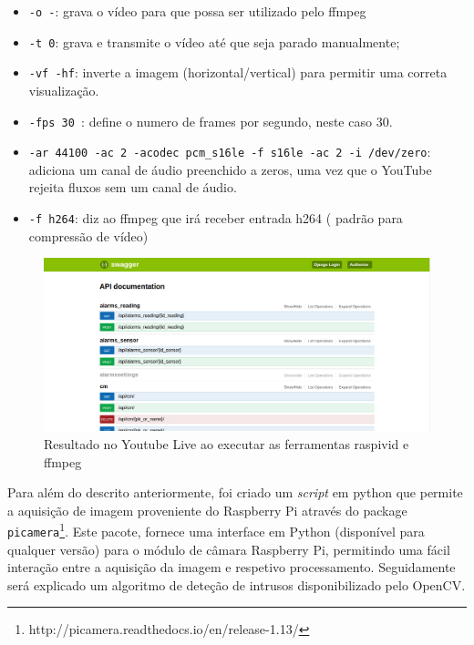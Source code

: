\begin{itemize}
	\item \texttt{-o -}: grava o vídeo para que possa ser utilizado pelo ffmpeg 
	
	\item \texttt{-t 0}: grava e transmite o vídeo até que seja parado manualmente; 
	
	\item \texttt{-vf -hf}: inverte a imagem (horizontal/vertical) para permitir uma correta visualização. 
	
	\item \texttt{-fps 30 }: define o numero de frames por segundo, neste caso 30. 
	
	\item \texttt{-ar 44100 -ac 2 -acodec pcm\_s16le -f s16le -ac 2 -i /dev/zero}: adiciona um canal de áudio preenchido a zeros, uma vez que o YouTube rejeita fluxos sem um canal de áudio.
	
	\item \texttt{-f h264}: diz ao ffmpeg que irá receber entrada h264 ( padrão para compressão de vídeo) 
	
\end{itemize}


\begin{figure}[h]
	\centering
	\includegraphics[width=0.8\linewidth]{prints-web/api-doc.png}
	\caption{Resultado no Youtube Live ao executar as ferramentas raspivid  e ffmpeg }
	\label{docapi}
\end{figure}




Para além do descrito anteriormente, foi criado um \textit{script} em python que permite a aquisição de imagem proveniente do Raspberry Pi através do package \texttt{picamera}\footnote{http://picamera.readthedocs.io/en/release-1.13/}. Este pacote, fornece  uma interface em Python (disponível para qualquer versão) para o módulo de câmara Raspberry Pi, permitindo uma fácil interação entre a aquisição da imagem e respetivo processamento.
Seguidamente será explicado um algoritmo de deteção de intrusos disponibilizado pelo OpenCV. 


